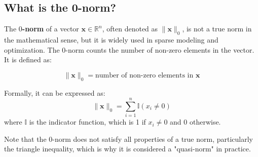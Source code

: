 \subsection{What is the 0-norm?}

The \textbf{$0$-norm} of a vector $\mathbf{x} \in \mathbb{R}^n$, often denoted as $\|\mathbf{x}\|_0$, is not a true norm in the mathematical sense, but it is widely used in sparse modeling and optimization. The $0$-norm counts the number of non-zero elements in the vector. It is defined as:

\[
\|\mathbf{x}\|_0 = \text{number of non-zero elements in } \mathbf{x}
\]

Formally, it can be expressed as:
\[
\|\mathbf{x}\|_0 = \sum_{i=1}^{n} \mathbb{I}(x_i \neq 0)
\]
where $\mathbb{I}$ is the indicator function, which is 1 if $x_i \neq 0$ and 0 otherwise.

Note that the $0$-norm does not satisfy all properties of a true norm, particularly the triangle inequality, which is why it is considered a "quasi-norm" in practice.
